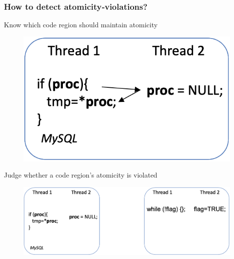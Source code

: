 % 
% 
% 
\begin{frame}[fragile]
    \frametitle{How to detect atomicity‐violations?}

Know which code region should maintain atomicity

    \begin{figure}
    \includegraphics[width=0.27\linewidth]{figs/atomicity.png}
    \end{figure} \pause

Judge whether a code region’s atomicity is violated

    \begin{figure}
    \includegraphics[width=0.6\linewidth]{figs/atomic-region.png}
    \end{figure}
\end{frame}
% 
% 
% 
% 
% 
% 
% 
% 

